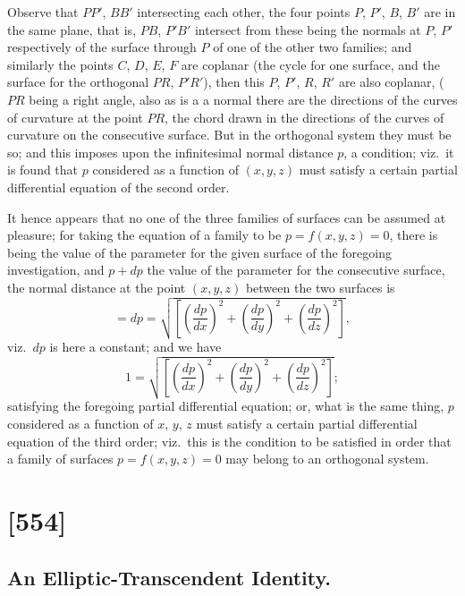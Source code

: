 \documentclass[11pt,a4paper]{book}
\begin{document}
Observe that $PP'$, $BB'$ intersecting each other, the four points $P$, $P'$, $B$, $B'$ are
in the same plane, that is, $PB$, $P'B'$ intersect from these being the normals at $P$, $P'$
respectively of the surface through $P$ of one of the other two families; and similarly
the points $C$, $D$, $E$, $F$ are coplanar (the cycle for one surface, and the surface for
the orthogonal $PR$, $P'R'$), then this $P$, $P'$, $R$, $R'$ are also coplanar, ($PR$ being a right angle, also as is a a normal there are the directions of the curves
of curvature at the point $PR$, the chord drawn in the directions of the curves of
curvature on the consecutive surface. But in the orthogonal system they must be so;
and this imposes upon the infinitesimal normal distance $p$, a condition; viz.\ it is found
that $p$ considered as a function of $(x, y, z)$ must satisfy a certain partial differential
equation of the second order.

It hence appears that no one of the three families of surfaces can be assumed
at pleasure; for taking the equation of a family to be $p = f(x, y, z) = 0$, there is being
the value of the parameter for the given surface of the foregoing investigation, and
$p + dp$ the value of the parameter for the consecutive surface, the normal distance at
the point $(x, y, z)$ between the two surfaces is
\[
= dp = \sqrt{\left[\left(\frac{dp}{dx}\right)^2 + \left(\frac{dp}{dy}\right)^2 + \left(\frac{dp}{dz}\right)^2\right]},
\]
viz.\ $dp$ is here a constant; and we have
\[
1 = \sqrt{\left[\left(\frac{dp}{dx}\right)^2 + \left(\frac{dp}{dy}\right)^2 + \left(\frac{dp}{dz}\right)^2\right]};
\]
satisfying the foregoing partial differential equation; or, what is the same thing, $p$
considered as a function of $x$, $y$, $z$ must satisfy a certain partial differential equation
of the third order; viz.\ this is the condition to be satisfied in order that a family of
surfaces $p = f(x, y, z) = 0$ may belong to an orthogonal system.

\clearpage

\section{[554]}
\subsection{An Elliptic-Transcendent Identity.}
\end{document}
